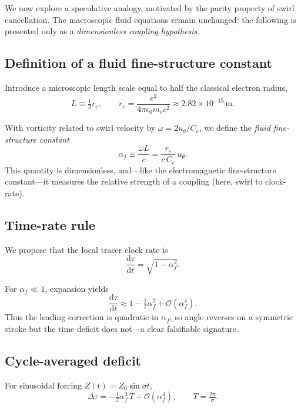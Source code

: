 \documentclass[12pt]{article}
\newcommand{\dd}{\mathrm{d}}
\newcommand{\Ce}{C_e} %
\newcommand{\re}{r_e} %
\begin{document}
    We now explore a speculative analogy, motivated by the parity property of swirl cancellation.
    The macroscopic fluid equations remain unchanged; the following is presented only as a \emph{dimensionless coupling hypothesis}.

    \subsection{Definition of a fluid fine-structure constant}
    Introduce a microscopic length scale equal to half the classical electron radius,
    \[
        L \equiv \tfrac{1}{2}\re,
        \qquad
        \re = \frac{e^2}{4\pi\epsilon_0 m_e c^2} \approx 2.82\times 10^{-15}\,\mathrm{m}.
    \]

    With vorticity related to swirl velocity by
    \(\omega = 2u_\theta/\Ce\),
    we define the \emph{fluid fine-structure constant}
    \begin{equation}
        \boxed{\;\alpha_f \equiv \frac{\omega L}{c}
            = \frac{\re}{c\,\Ce}\,u_\theta.\;}
    \end{equation}
    This quantity is dimensionless, and---like the electromagnetic fine-structure constant---it measures the relative strength of a coupling (here, swirl to clock-rate).

    \subsection{Time-rate rule}
    We propose that the local tracer clock rate is
    \begin{equation}
        \boxed{\;
        \frac{\dd \tau}{\dd t} = \sqrt{1-\alpha_f^2}.
        \;}
    \end{equation}

    For $\alpha_f\ll1$, expansion yields
    \[
        \frac{\dd \tau}{\dd t} \approx 1 - \tfrac{1}{2}\alpha_f^2 + \mathcal{O}(\alpha_f^4).
    \]
    Thus the leading correction is quadratic in $\alpha_f$, so angle reverses on a symmetric stroke but the time deficit does not---a clear falsifiable signature.

    \subsection{Cycle-averaged deficit}
    For sinusoidal forcing \(Z(t)=Z_0\sin\sigma t\),
    \[
        \Delta \tau = -\tfrac{1}{2}\alpha_f^2\,T + \mathcal{O}(\alpha_f^4),
        \qquad T=\tfrac{2\pi}{\sigma}.
    \]
\end{document}
